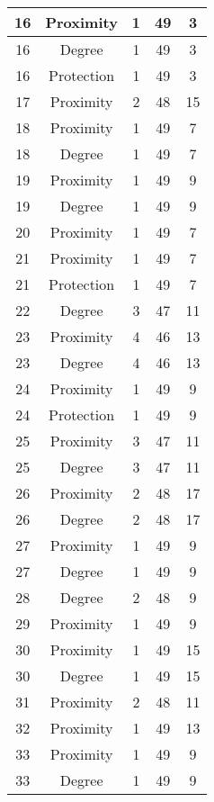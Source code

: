\documentclass[results.tex]{subfiles}
\begin{document}
\begin{center}
\begin{tabular}{| c || c | c | c | c |}
    \hline
    16 & Proximity & 1 & 49 & 3 \\ 
    \hline
    16 & Degree & 1 & 49 & 3 \\ 
    \hline
    16 & Protection & 1 & 49 & 3 \\ 
    \hline
    17 & Proximity & 2 & 48 & 15 \\ 
    \hline
    18 & Proximity & 1 & 49 & 7 \\ 
    \hline
    18 & Degree & 1 & 49 & 7 \\ 
    \hline
    19 & Proximity & 1 & 49 & 9 \\ 
    \hline
    19 & Degree & 1 & 49 & 9 \\ 
    \hline
    20 & Proximity & 1 & 49 & 7 \\ 
    \hline
    21 & Proximity & 1 & 49 & 7 \\ 
    \hline
    21 & Protection & 1 & 49 & 7 \\ 
    \hline
    22 & Degree & 3 & 47 & 11 \\ 
    \hline
    23 & Proximity & 4 & 46 & 13 \\ 
    \hline
    23 & Degree & 4 & 46 & 13 \\ 
    \hline
    24 & Proximity & 1 & 49 & 9 \\ 
    \hline
    24 & Protection & 1 & 49 & 9 \\ 
    \hline
    25 & Proximity & 3 & 47 & 11 \\ 
    \hline
    25 & Degree & 3 & 47 & 11 \\ 
    \hline
    26 & Proximity & 2 & 48 & 17 \\ 
    \hline
    26 & Degree & 2 & 48 & 17 \\ 
    \hline
    27 & Proximity & 1 & 49 & 9 \\ 
    \hline
    27 & Degree & 1 & 49 & 9 \\ 
    \hline
    28 & Degree & 2 & 48 & 9 \\ 
    \hline
    29 & Proximity & 1 & 49 & 9 \\ 
    \hline
    30 & Proximity & 1 & 49 & 15 \\ 
    \hline
    30 & Degree & 1 & 49 & 15 \\ 
    \hline
    31 & Proximity & 2 & 48 & 11 \\ 
    \hline
    32 & Proximity & 1 & 49 & 13 \\ 
    \hline
    33 & Proximity & 1 & 49 & 9 \\ 
    \hline
    33 & Degree & 1 & 49 & 9 \\ 
    \hline

\end{tabular}
\end{center}
\end{document}
